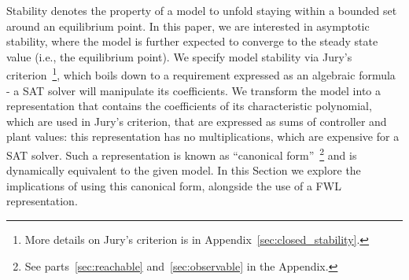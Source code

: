 \documentclass[sigconf]{llncs}
\begin{document}
Stability denotes the property of a model to unfold staying within a bounded set around an equilibrium point. 
In this paper, we are interested in asymptotic stability, where the model is further expected to converge to the steady state value (i.e., the equilibrium point).   
%
We specify model stability via Jury's criterion~\cite{fadali}\footnote{More details on Jury's criterion is in Appendix~\ref{sec:closed_stability}.}, 
which boils down to a requirement expressed as an algebraic formula - a SAT solver will manipulate its coefficients. 
%
We transform the model into a representation that contains the coefficients of its characteristic polynomial, which are used in Jury's criterion, 
that are expressed as sums of controller and plant values: 
this representation has no multiplications, which are expensive for a SAT solver.   
%
Such a representation is known as 
``canonical form''~\cite{Astrom08}\footnote{See parts~\ref{sec:reachable} and~\ref{sec:observable} in the Appendix.} 
and is dynamically equivalent to the given model.  
In this Section we explore the implications of using this canonical form, 
alongside the use of a FWL representation. 

\medskip
\end{document}
